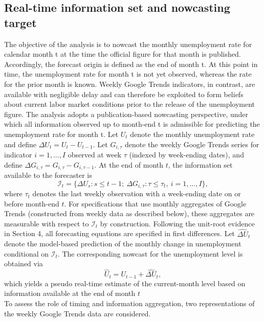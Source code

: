 \documentclass[12pt,a4paper]{article}
\begin{document}
\subsection{Real-time information set and nowcasting target}
\label{subsec:info_set}
The objective of the analysis is to nowcast the monthly unemployment rate for calendar month t at the time the official figure for that month is published. 
Accordingly, the forecast origin is defined as the end of month t. At this point in time, the unemployment rate for month t is not yet observed, whereas the rate for the prior month is known.
Weekly Google Trends indicators, in contrast, are available with negligible delay and can therefore be exploited to form beliefs about current labor market conditions prior to the release of the unemployment figure. The analysis adopts a publication-based nowcasting perspective, under which all information observed up to month-end t is admissible for predicting the unemployment rate for month t. 
Let $U_t$ denote the monthly unemployment rate and define $\Delta U_t = U_t - U_{t-1}$.
Let $G_{i,\tau}$ denote the weekly Google Trends series for indicator $i=1,\dots,I$ observed at week $\tau$ (indexed by week-ending dates),
and define $\Delta G_{i,\tau} = G_{i,\tau} - G_{i,\tau-1}$.
At the end of month $t$, the information set available to the forecaster is
\begin{equation}
\mathcal{I}_t =
\big\{ \Delta U_s : s \le t-1;\ 
       \Delta G_{i,\tau} : \tau \le \tau_t,\ i=1,\dots,I \big\},
\label{eq:info_set}
\end{equation}
where $\tau_t$ denotes the last weekly observation with a week-ending date on or before month-end $t$.
For specifications that use monthly aggregates of Google Trends (constructed from weekly data as described below),
these aggregates are measurable with respect to $\mathcal{I}_t$ by construction.
Following the unit-root evidence in Section 4, all forecasting equations are specified in first differences. Let $\widehat{\Delta U}_t$ denote the model-based prediction of the monthly change in unemployment conditional on $\mathcal{I}_t$. The corresponding nowcast for the unemployment level is obtained via
\begin{equation}
    \widehat{U}_t = U_{t-1} + \widehat{\Delta U}_t,
    \label{eq:level_forecast}
\end{equation}
which yields a pseudo real-time estimate of the current-month level based on information available at the end of month $t$\\
To assess the role of timing and information aggregation, two representations of the weekly Google Trends data are considered.
\end{document}
